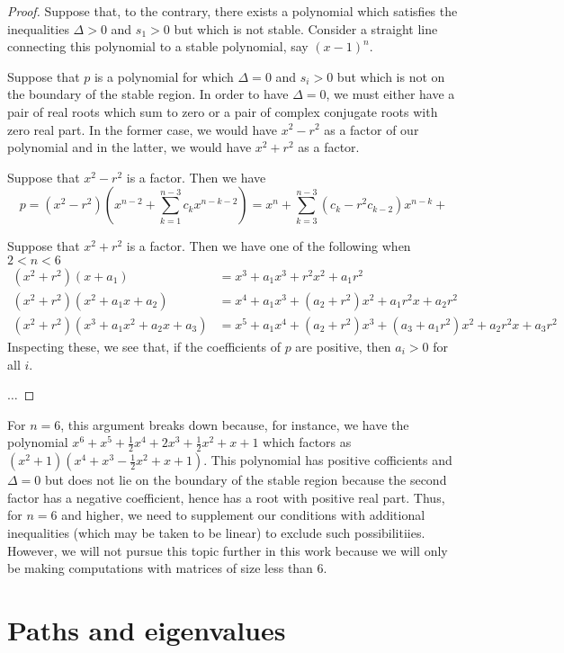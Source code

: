 \begin{proof}
Suppose that, to the contrary, there exists a polynomial which satisfies
the inequalities $\Delta > 0$ and $s_1 > 0$ but which is not stable.
Consider a straight line connecting this polynomial to a stable polynomial,
say $(x - 1)^n$.

Suppose that $p$ is a polynomial for which $\Delta = 0$ and $s_i > 0$ but
which is not on the boundary of the stable region.  In order to have
$\Delta = 0$, we must either have a pair of real roots which sum to zero
or a pair of complex conjugate roots with zero real part.  In the former
case, we would have $x^2 - r^2$ as a factor of our polynomial and in the
latter, we would have $x^2 + r^2$ as a factor.

Suppose that $x^2 - r^2$ is a factor.  Then we have
\[
p = (x^2 - r^2) \left(x^{n-2} + \sum_{k=1}^{n-3} c_k x^{n-k-2} \right) =
x^n + \sum_{k=3}^{n-3} (c_k - r^2 c_{k-2}) x^{n-k} +
\]

Suppose that $x^2 + r^2$ is a factor. Then we have one of the following
when $2 < n < 6$
\begin{align*}
(x^2 + r^2)(x + a_1) &=
x^3 + a_1 x^3 + r^2 x^2 + a_1 r^2 \\
(x^2 + r^2)(x^2 + a_1 x + a_2) &=
x^4 + a_1 x^3 + (a_2 + r^2) x^2 + a_1 r^2 x + a_2 r^2 \\
(x^2 + r^2)(x^3 + a_1 x^2 + a_2 x + a_3) &=
x^5 + a_1 x^4 + (a_2 + r^2) x^3 + (a_3 + a_1 r^2) x^2 + a_2 r^2 x + a_3 r^2
\end{align*}
Inspecting these, we see that, if the coefficients of $p$ are positive,
then $a_i > 0$ for all $i$.

$\ldots$
\end{proof}

For $n = 6$, this argument breaks down because, for instance, we have
the polynomial $x^6 + x^5 +\frac{1}{2} x^4 + 2x^3 + \frac{1}{2} x^2 +
x + 1$  which factors as  $(x^2 + 1)(x^4 + x^3 - \frac{1}{2} x^2 + x + 1)$.
This polynomial has positive cofficients and $\Delta = 0$ but does not
lie on the boundary of the stable region because the second factor has
a negative coefficient, hence has a root with positive real part.  Thus,
for $n = 6$ and higher, we need to supplement our conditions with
additional inequalities (which may be taken to be linear) to exclude
such possibilitiies.  However, we will not pursue this topic further
in this work because we will only be making computations with matrices
of size less than $6$.

\section{Paths and eigenvalues}


